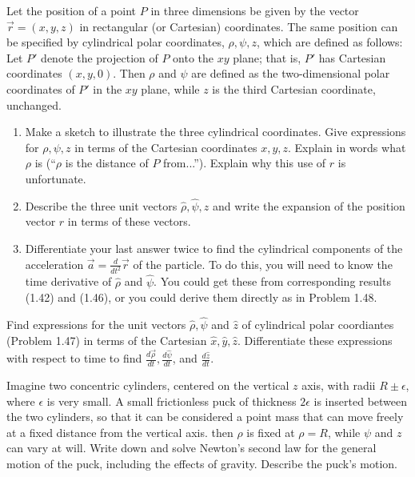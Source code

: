 \begin{tcolorbox}[title=Problem 47, breakable]
    Let the position of a point $P$ in three dimensions 
    be given by the vector $\vec{r} = (x, y, z)$ in 
    rectangular (or Cartesian) coordinates. The same position 
    can be specified by cylindrical polar coordinates,
    $\rho, \psi, z$, which are defined as follows: Let $P'$
    denote the projection of $P$ onto the $xy$ plane; that is,
    $P'$ has Cartesian coordinates $(x, y, 0)$. Then $\rho$ and $\psi$
    are defined as the two-dimensional polar coordinates of $P'$
    in the $xy$ plane, while $z$ is the third Cartesian coordinate,
    unchanged.
    \begin{enumerate}
        \item Make a sketch to illustrate the three cylindrical coordinates.
        Give expressions for $\rho, \psi, z$ in terms of the 
        Cartesian coordinates $x, y, z$. Explain in words what $\rho$ is 
        (``$\rho$ is the distance of $P$ from...'').
        Explain why this use of $r$ is unfortunate.
        \item Describe the three unit vectors $\hat{\rho}, \hat{\psi}, \hat{z}$ and 
        write the expansion of the position vector $r$ in terms of these vectors.
        \item Differentiate your last answer twice to find the 
        cylindrical components of the acceleration $\vec{a} = \frac{d}{dt^2} \vec{r}$ of the particle.
        To do this, you will need to know the time derivative of $\hat{\rho}$
        and $\hat{\psi}$. You could get these from corresponding results (1.42)
        and (1.46), or you could derive them directly as in Problem 1.48.
    \end{enumerate}
\end{tcolorbox}

\begin{tcolorbox}[title=Problem 48, breakable]
    Find expressions for the unit vectors 
    $\hat{\rho}, \hat{\psi}$ and $\hat{z}$ of cylindrical
    polar coordiantes (Problem 1.47) in terms of the Cartesian 
    $\hat{x}, \hat{y}, \hat{z}$. Differentiate these 
    expressions with respect to time to find $\frac{d \vec{\rho}}{dt}, \frac{d \hat{\psi}}{dt}$, and $\frac{d \hat{z}}{dt}$.
\end{tcolorbox}

\begin{tcolorbox}[title=Problem 49, breakable]
    Imagine two concentric cylinders, centered on the 
    vertical $z$ axis, with radii $R \pm \epsilon$, 
    where $\epsilon$ is very small. A small frictionless 
    puck of thickness $2 \epsilon$ is inserted between the two cylinders,
    so that it can be considered a point mass that can move freely
    at a fixed distance from the vertical axis.
    then $\rho$ is fixed at $\rho = R$, while $\psi$ and $z$
    can vary at will. Write down and solve Newton's second law for the 
    general motion of the puck, including the effects of gravity.
    Describe the puck's motion.
\end{tcolorbox}

